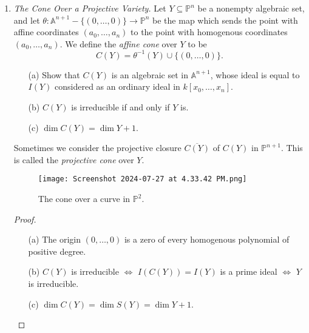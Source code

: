 \documentclass[12pt]{article}
\newcommand{\A}{\mathbb{A}}
\newcommand{\PP}{\mathbb{P}}
\theoremstyle{definition}
\begin{document}
\begin{enumerate} [label=\textbf{\arabic*.}, leftmargin=-0.05em]
\item \textit{The Cone Over a Projective Variety.} Let $Y \subseteq \PP^n$ be a nonempty algebraic set, and let $\theta : \A^{n + 1} - \{(0, \dots, 0) \} \to \PP^n$ be the map which sends the point with affine coordinates $(a_0, \dots, a_n)$ to the point with homogenous coordinates $(a_0, \dots, a_n)$. We define the \textit{affine cone} over $Y$ to be
\begin{equation*}
    C(Y) = \theta^{-1}(Y) \cup \{ (0, \dots, 0) \}.
\end{equation*}
\begin{itemize}
    \item[(a)] Show that $C(Y)$ is an algebraic set in $\A^{n + 1}$, whose ideal is equal to $I(Y)$ considered as an ordinary ideal in $k[x_0, \dots, x_n]$.
    \item[(b)] $C(Y)$ is irreducible if and only if $Y$ is.
    \item[(c)] $\dim{C(Y)} = \dim{Y} + 1$.
\end{itemize}
Sometimes we consider the projective closure $\overline{C(Y)}$ of $C(Y)$ in $\PP^{n + 1}$. This is called the \textit{projective cone} over $Y$.
\begin{figure}[H]
    \centering
    \texttt{[image: Screenshot 2024-07-27 at 4.33.42 PM.png]}
    \caption{The cone over a curve in $\PP^2$.}
\end{figure}

\begin{proof} $ $ \vspace{0pt}
    \begin{itemize}
        \item[(a)] The origin $(0, \dots, 0)$ is a zero of every homogenous polynomial of positive degree.
        \item[(b)] $C(Y)$ is irreducible $\iff$ $I(C(Y)) = I(Y)$ is a prime ideal $\iff$ $Y$ is irreducible.
        \item[(c)] $\dim{C(Y)} = \dim{S(Y)} = \dim{Y} + 1$.
    \end{itemize}
\end{proof}


\end{enumerate}
\end{document}
